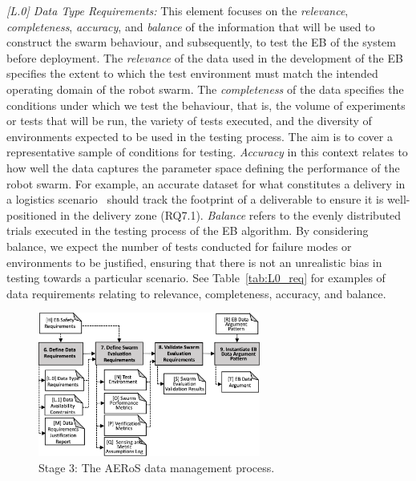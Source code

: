 \documentclass{article}
\begin{document}
\emph{[L.0] Data Type Requirements:}
This element focuses on the \emph{relevance}, \emph{completeness}, \emph{accuracy}, and \emph{balance} of the information that will be used to construct the swarm behaviour, and subsequently, to test the EB of the system before deployment. The \emph{relevance} of the data used in the development of the EB specifies the extent to which the test environment must match the intended operating domain of the robot swarm. The \emph{completeness} of the data specifies the conditions under which we test the behaviour, that is, the volume of experiments or tests that will be run, the variety of tests executed, and the diversity of environments expected to be used in the testing process. The aim is to cover a representative sample of conditions for testing. 
\emph{Accuracy} in this context relates to how well the data captures the parameter space defining the performance of the robot swarm. For example, an accurate dataset for what constitutes a delivery in a logistics scenario~\cite{milner2022stochastic} should track the footprint of a deliverable to ensure it is well-positioned in the delivery zone (RQ7.1). 
\emph{Balance} refers to the evenly distributed trials executed in the testing process of the EB algorithm. 
By considering balance, we expect the number of tests conducted for failure modes or environments to be justified, ensuring that there is not an unrealistic bias in testing towards a particular scenario. See Table~\ref{tab:L0_req} for examples of data requirements relating to relevance, completeness, accuracy, and balance.

\begin{figure}[!b]
\centering
\includegraphics[width=0.65\textwidth]{AERoS-Stage3.pdf}
\caption{Stage 3: The AERoS data management process.}
\label{aeros-stage3}
\end{figure}
\end{document}

